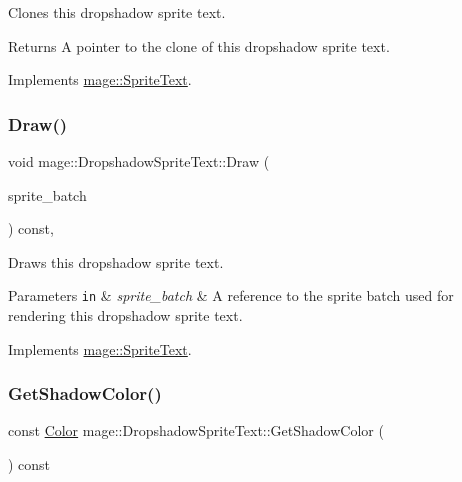 Clones this dropshadow sprite text.

\begin{DoxyReturn}{Returns}
A pointer to the clone of this dropshadow sprite text. 
\end{DoxyReturn}


Implements \hyperlink{classmage_1_1_sprite_text_aa2c63346f5ad7f63f7a6d474df3556ef}{mage\+::\+Sprite\+Text}.

\hypertarget{classmage_1_1_dropshadow_sprite_text_af76422c9812d7dc38e9b98e587103c67}{}\label{classmage_1_1_dropshadow_sprite_text_af76422c9812d7dc38e9b98e587103c67} 
\subsubsection{\texorpdfstring{Draw()}{Draw()}}
{\footnotesize\ttfamily void mage\+::\+Dropshadow\+Sprite\+Text\+::\+Draw (\begin{DoxyParamCaption}\item[{Sprite\+Batch \&}]{sprite\+\_\+batch }\end{DoxyParamCaption}) const\hspace{0.3cm}{\ttfamily [override]}, {\ttfamily [virtual]}}

Draws this dropshadow sprite text.


\begin{DoxyParams}[1]{Parameters}
\mbox{\tt in}  & {\em sprite\+\_\+batch} & A reference to the sprite batch used for rendering this dropshadow sprite text. \\
\hline
\end{DoxyParams}


Implements \hyperlink{classmage_1_1_sprite_text_a45d5ac8410d5a46b26e8491946a2ad9e}{mage\+::\+Sprite\+Text}.

\hypertarget{classmage_1_1_dropshadow_sprite_text_a5aebe32b778feb5e4f82ff11fbc4636f}{}\label{classmage_1_1_dropshadow_sprite_text_a5aebe32b778feb5e4f82ff11fbc4636f} 
\subsubsection{\texorpdfstring{Get\+Shadow\+Color()}{GetShadowColor()}}
{\footnotesize\ttfamily const \hyperlink{structmage_1_1_color}{Color} mage\+::\+Dropshadow\+Sprite\+Text\+::\+Get\+Shadow\+Color (\begin{DoxyParamCaption}{ }\end{DoxyParamCaption}) const\hspace{0.3cm}{\ttfamily [noexcept]}}

